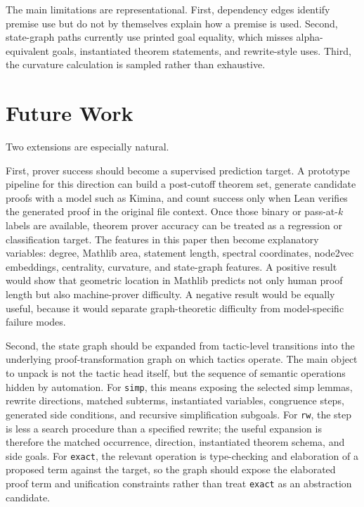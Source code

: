 \documentclass[11pt]{article}
\begin{document}
The main limitations are representational. First, dependency edges identify
premise use but do not by themselves explain how a premise is used. Second,
state-graph paths currently use printed goal equality, which misses
alpha-equivalent goals, instantiated theorem statements, and rewrite-style
uses. Third, the curvature calculation is sampled rather than exhaustive.

\section{Future Work}

Two extensions are especially natural.

First, prover success should become a supervised prediction target. A prototype
pipeline for this direction can build a post-cutoff theorem set, generate
candidate proofs with a model such as Kimina, and count success only when Lean
verifies the generated proof in the original file context. Once those binary or
pass-at-$k$ labels are available, theorem prover accuracy can be treated as a
regression or classification target. The features in this paper then become
explanatory variables: degree, Mathlib area, statement length, spectral
coordinates, node2vec embeddings, centrality, curvature, and state-graph
features. A positive result would show that geometric location in Mathlib
predicts not only human proof length but also machine-prover difficulty. A
negative result would be equally useful, because it would separate
graph-theoretic difficulty from model-specific failure modes.

Second, the state graph should be expanded from tactic-level transitions into
the underlying proof-transformation graph on which tactics operate. The main
object to unpack is not the tactic head itself, but the sequence of semantic
operations hidden by automation. For \texttt{simp}, this means exposing the
selected simp lemmas, rewrite directions, matched subterms, instantiated
variables, congruence steps, generated side conditions, and recursive
simplification subgoals. For \texttt{rw}, the step is less a search procedure
than a specified rewrite; the useful expansion is therefore the matched
occurrence, direction, instantiated theorem schema, and side goals. For
\texttt{exact}, the relevant operation is type-checking and elaboration of a
proposed term against the target, so the graph should expose the elaborated
proof term and unification constraints rather than treat \texttt{exact} as an
abstraction candidate.
\end{document}
